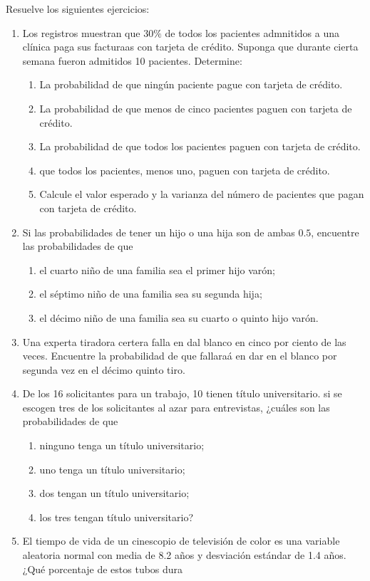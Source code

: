 \begin{Ejer}
Resuelve los siguientes ejercicios:
\begin{enumerate}

\item Los registros muestran que $30\%$ de todos los pacientes admnitidos a una clínica paga sus facturaas con tarjeta de crédito. Suponga que durante cierta semana fueron admitidos 10 pacientes. Determine:
\begin{enumerate}
\item La probabilidad de que ningún paciente pague con tarjeta de crédito.
\item La probabilidad de que menos de cinco pacientes paguen con tarjeta de crédito.
\item La probabilidad de que todos los pacientes paguen con tarjeta de crédito.
\item que todos los pacientes, menos uno, paguen con tarjeta de crédito.
\item Calcule el valor esperado y la varianza del número de pacientes que pagan con tarjeta de crédito.
\end{enumerate}

\item Si las probabilidades de tener un hijo o una hija son de ambas $0.5$, encuentre las probabilidades de que
\begin{enumerate}
\item el cuarto niño de una familia sea el primer hijo varón;
\item el séptimo niño de una familia sea su segunda hija;
\item el décimo niño de una familia sea su cuarto o quinto hijo varón.
\end{enumerate}

\item Una experta tiradora certera falla en dal blanco en cinco por ciento de las veces. Encuentre la probabilidad de que fallaraá en dar en el blanco por segunda vez en el décimo quinto tiro.

\item De los 16 solicitantes para un trabajo, 10 tienen título universitario. si se escogen tres de los solicitantes al azar para entrevistas, ¿cuáles son las probabilidades de que 

\begin{enumerate}
\item ninguno tenga un título universitario;
\item uno tenga un título universitario;
\item dos tengan un título universitario;
\item los tres tengan título universitario?
\end{enumerate}
\item El tiempo de vida de un cinescopio de televisión de color es una variable aleatoria normal con media de 8.2 años y desviación estándar de 1.4 años. ¿Qué porcentaje de estos tubos dura


\end{enumerate}
\end{Ejer}
